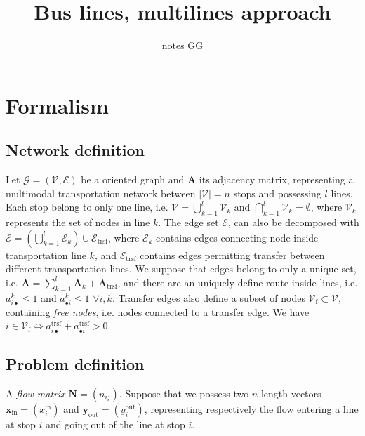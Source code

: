 \documentclass[11p]{article}
\title{Bus lines, multilines approach}
\author{notes GG}
\begin{document}
\maketitle

\section{Formalism}

\subsection{Network definition}

Let $\mathcal{G} = (\mathcal{V}, \mathcal{E})$ be a oriented graph and $\mathbf{A}$ its adjacency matrix, representing a multimodal transportation network between $|\mathcal{V}| = n$ stops and possessing $l$ lines. Each stop belong to only one line, i.e. $\mathcal{V} = \bigcup_{k=1}^l \mathcal{V}_k$ and $\bigcap_{k=1}^l \mathcal{V}_k = \emptyset$, where $\mathcal{V}_k$ represents the set of nodes in line $k$. The edge set $\mathcal{E}$, can also be decomposed with $\mathcal{E} = \left(\bigcup_{k=1}^l \mathcal{E}_k\right) \cup \mathcal{E}_\text{trsf}$, where $\mathcal{E}_k$ contains edges connecting node inside transportation line $k$, and $\mathcal{E}_\text{trsf}$ contains edges permitting transfer between different transportation lines. We suppose that edges belong to only a unique set, i.e. $\mathbf{A} = \sum_{k=1}^l \mathbf{A}_k + \mathbf{A}_\text{trsf}$, and there are an uniquely define route inside lines, i.e. $a^k_{i \bullet} \leq 1$ and $a^k_{\bullet i} \leq 1$ $\forall i,k$. Transfer edges also define a subset of nodes $\mathcal{V}_\text{f} \subset \mathcal{V}$, containing \emph{free nodes}, i.e. nodes connected to a transfer edge. We have $i \in \mathcal{V}_\text{f} \iff a^\text{trsf}_{i \bullet} + a^\text{trsf}_{\bullet i} > 0$.

\subsection{Problem definition}

A \emph{flow matrix} $\mathbf{N} = (n_{ij})$. Suppose that we possess two $n$-length vectors $\mathbf{x}_\text{in} = (x^\text{in}_i)$ and $\mathbf{y}_\text{out} = (y^\text{out}_i)$, representing respectively the flow entering a line at stop $i$ and going out of the line at stop $i$.
\end{document}
